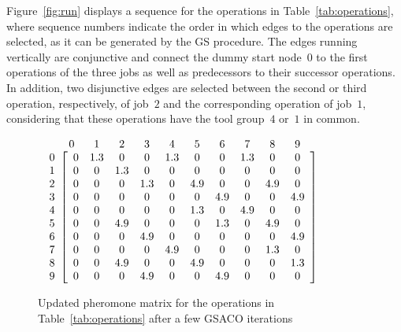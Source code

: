 \documentclass[runningheads]{llncs}
\begin{document}
%
Figure~\ref{fig:run} displays a sequence
for the operations in Table~\ref{tab:operations}, 
where sequence numbers indicate the order in which
edges to the operations are selected,
as it can be generated by the GS procedure.
The edges running vertically are conjunctive and connect 
the dummy start node~$0$ to the first operations 
of the three jobs as well as predecessors to their
successor operations.
In addition, two disjunctive edges are selected between
the second or third
operation, respectively, of job~$2$ and the corresponding operation of job~$1$, considering that these operations have the tool group~$4$ or~$1$ in common.

\begin{figure}[t]
\centering 
$\begin{array}{c@{}c}
	& \begin{array}{cccccccccc} 0\phantom{.5} & 1\phantom{.5} & 2\phantom{.5} & 3\phantom{.5} & 4\phantom{.5} & 5\phantom{.5} & 6\phantom{.5} & 7\phantom{.5} & 8\phantom{.5} & 9\phantom{.5} \end{array} \\
	\begin{array}{c} 0 \\ 1 \\ 2 \\ 3 \\ 4 \\ 5 \\ 6 \\ 7 \\ 8 \\ 9 \end{array} &
	\left[\begin{array}{cccccccccc}
		0 & 1.3 & 0 & 0 & 1.3 & 0 & 0 & 1.3 & 0 & 0 \\
		0 & 0 & 1.3 & 0 & 0 & 0 & 0 & 0 & 0 & 0     \\
		0 & 0 & 0 & 1.3 & 0 & 4.9 & 0 & 0 & 4.9 & 0 \\
		0 & 0 & 0 & 0 & 0 & 0 & 4.9 & 0 & 0 & 4.9   \\
		0 & 0 & 0 & 0 & 0 & 1.3 & 0 & 4.9 & 0 & 0   \\
		0 & 0 & 4.9 & 0 & 0 & 0 & 1.3 & 0 & 4.9 & 0 \\
		0 & 0 & 0 & 4.9 & 0 & 0 & 0 & 0 & 0 & 4.9   \\
		0 & 0 & 0 & 0 & 4.9 & 0 & 0 & 0 & 1.3 & 0   \\
		0 & 0 & 4.9 & 0 & 0 & 4.9 & 0 & 0 & 0 & 1.3 \\
		0 & 0 & 0 & 4.9 & 0 & 0 & 4.9 & 0 & 0 & 0   \\
	\end{array}\right]
\end{array}$
\caption{Updated pheromone matrix for the operations in Table~\ref{tab:operations} after a few GSACO iterations}
\label{fig:update_p}
\end{figure}
\end{document}
